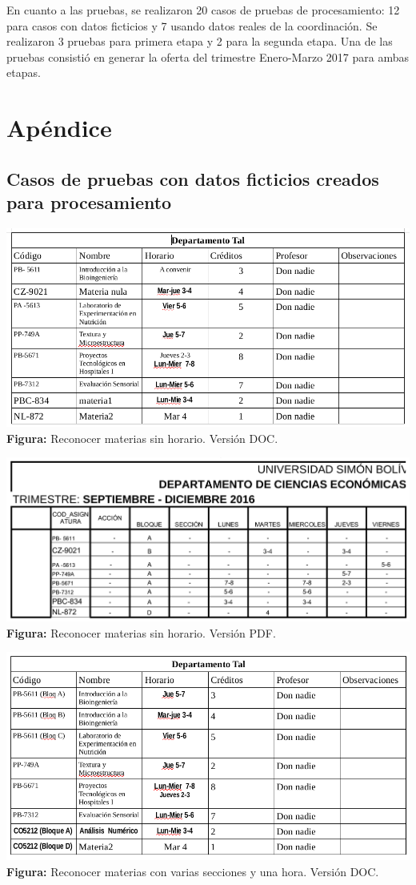 \documentclass[]{article}
\begin{document}
En cuanto a las pruebas, se realizaron 20 casos de pruebas de
procesamiento: 12 para casos con datos ficticios y 7 usando datos reales
de la coordinación. Se realizaron 3 pruebas para primera etapa y 2 para
la segunda etapa. Una de las pruebas consistió en generar la oferta del
trimestre Enero-Marzo 2017 para ambas etapas.

\section{Apéndice}\label{apuxe9ndice}

\subsection{Casos de pruebas con datos ficticios creados para
procesamiento}\label{casos-de-pruebas-con-datos-ficticios-creados-para-procesamiento}

\includegraphics{casos_pruebas/doc1DOC.png} \textbf{Figura:} Reconocer
materias sin horario. Versión DOC.

\includegraphics{casos_pruebas/doc1PDF.png} \textbf{Figura:} Reconocer
materias sin horario. Versión PDF.

\includegraphics{casos_pruebas/doc2DOC.png} \textbf{Figura:} Reconocer
materias con varias secciones y una hora. Versión DOC.
\end{document}
